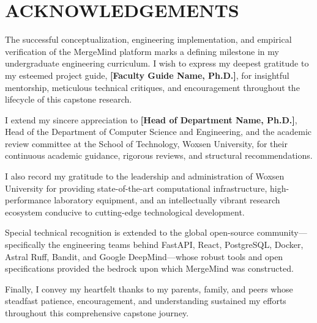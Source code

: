 \chapter*{ACKNOWLEDGEMENTS}

The successful conceptualization, engineering implementation, and empirical verification of the MergeMind platform marks a defining milestone in my undergraduate engineering curriculum. I wish to express my deepest gratitude to my esteemed project guide, \textbf{[Faculty Guide Name, Ph.D.]}, for insightful mentorship, meticulous technical critiques, and encouragement throughout the lifecycle of this capstone research.

\vspace{0.4cm}
I extend my sincere appreciation to \textbf{[Head of Department Name, Ph.D.]}, Head of the Department of Computer Science and Engineering, and the academic review committee at the School of Technology, Woxsen University, for their continuous academic guidance, rigorous reviews, and structural recommendations.

\vspace{0.4cm}
I also record my gratitude to the leadership and administration of Woxsen University for providing state-of-the-art computational infrastructure, high-performance laboratory equipment, and an intellectually vibrant research ecosystem conducive to cutting-edge technological development.

\vspace{0.4cm}
Special technical recognition is extended to the global open-source community—specifically the engineering teams behind FastAPI, React, PostgreSQL, Docker, Astral Ruff, Bandit, and Google DeepMind—whose robust tools and open specifications provided the bedrock upon which MergeMind was constructed.

\vspace{0.4cm}
Finally, I convey my heartfelt thanks to my parents, family, and peers whose steadfast patience, encouragement, and understanding sustained my efforts throughout this comprehensive capstone journey.

